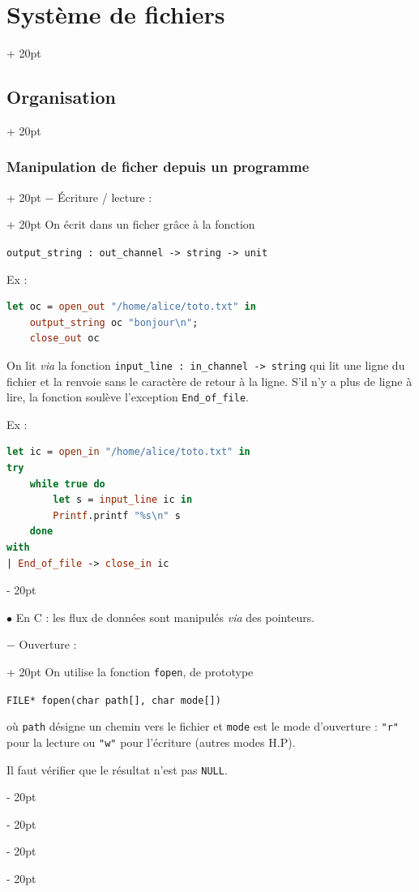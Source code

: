 \documentclass[a4paper, 12pt, twoside]{article}
\newcommand{\ind}[1][20pt]{\advance\leftskip + #1}
\newcommand{\deind}[1][20pt]{\advance\leftskip - #1}
\newenvironment{indentedenv}[1][20pt]{\par \ind[#1]}{\par \deind}
\newenvironment{indt}[2][20pt]{#2 \begin{indentedenv}[#1]}{\end{indentedenv}} %
\begin{document}
\begin{indt}{\section{Système de fichiers}}
\begin{indt}{\subsection{Organisation}}
\begin{indt}{\subsubsection{Manipulation de ficher depuis un programme}}
                \begin{indt}{$-$ \'Ecriture / lecture :}
                    On écrit dans un ficher grâce à la fonction
                    
                    \texttt{output\_string : out\_channel -> string -> unit}
                    
                    Ex :
                    \begin{lstlisting}[language=Caml, xleftmargin=100pt]
let oc = open_out "/home/alice/toto.txt" in
    output_string oc "bonjour\n";
    close_out oc\end{lstlisting}
                    
                    \vspace{6pt}
                    
                    On lit \textit{via} la fonction \texttt{input\_line : in\_channel -> string} qui lit une ligne du fichier et la renvoie sans le caractère de retour à la ligne.
                    S'il n'y a plus de ligne à lire, la fonction soulève l'exception \texttt{End\_of\_file}.
                    
                    Ex :
                    \begin{lstlisting}[language=Caml, xleftmargin=100pt]
let ic = open_in "/home/alice/toto.txt" in
try
    while true do
        let s = input_line ic in
        Printf.printf "%s\n" s
    done
with
| End_of_file -> close_in ic\end{lstlisting}
                \end{indt}
                \vspace{12pt}
                
                $\bullet$ En C : les flux de données sont manipulés \textit{via} des pointeurs.
                
                \begin{indt}{$-$ Ouverture :}
                    On utilise la fonction \texttt{fopen}, de prototype 
                    
                    \texttt{FILE* fopen(char path[], char mode[])}
                    
                    où \texttt{path} désigne un chemin vers le fichier et \texttt{mode} est le mode d'ouverture : \texttt{"r"} pour la lecture ou \texttt{"w"} pour l'écriture (autres modes H.P).
                    
                    Il faut vérifier que le résultat n'est pas \texttt{NULL}.
                \end{indt}
                

\end{indt}
\end{indt}
\end{indt}
\end{document}
